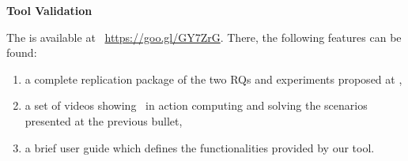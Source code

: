 \textbf{Tool Validation}

The \toolName is available at ~\url{https://goo.gl/GY7ZrG}.
There, the following features can be found:
\begin{enumerate}
\item a complete replication package of the two RQs and experiments proposed at ,
\item  a set of videos showing \toolName\ in action computing and solving the scenarios presented at the previous bullet,
\item a brief user guide which defines the functionalities provided by our tool.
\end{enumerate}
